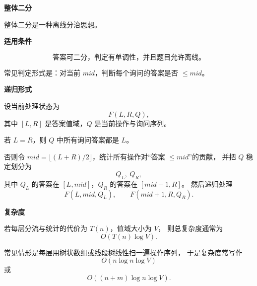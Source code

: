 \textbf{整体二分}

整体二分是一种离线分治思想。

\textbf{适用条件}

\[
\text{答案可二分，判定有单调性，并且题目允许离线。}
\]

常见判定形式是：对当前 \(mid\)，判断每个询问的答案是否 \(\le mid\)。

\textbf{递归形式}

设当前处理状态为
\[
F(L,R,Q),
\]
其中 \([L,R]\) 是答案值域，\(Q\) 是当前操作与询问序列。

若 \(L=R\)，则 \(Q\) 中所有询问答案都是 \(L\)。

否则令 \(mid=\lfloor(L+R)/2\rfloor\)，统计所有操作对“答案 \(\le mid\)”的贡献，
并把 \(Q\) 稳定划分为
\[
Q_L,\ Q_R,
\]
其中 \(Q_L\) 的答案在 \([L,mid]\)，\(Q_R\) 的答案在 \([mid+1,R]\)。
然后递归处理
\[
F(L,mid,Q_L),\qquad F(mid+1,R,Q_R).
\]

\textbf{复杂度}

若每层分流与统计的代价为 \(T(n)\)，值域大小为 \(V\)，
则总复杂度通常为
\[
O(T(n)\log V).
\]

常见情形是每层用树状数组或线段树线性扫一遍操作序列，
于是复杂度常写作
\[
O(n\log n\log V)
\]
或
\[
O((n+m)\log n\log V).
\]
